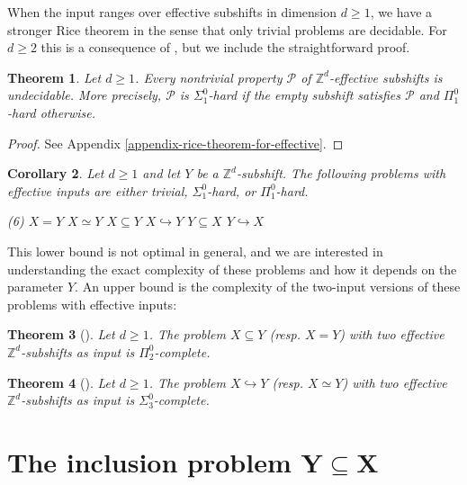 \documentclass[a4paper]{article}
\newcommand{\Z}{\mathbb{Z}}
\newtheorem{theorem}{Theorem}[section]
\newtheorem{corollary}[theorem]{Corollary}
\theoremstyle{definition}
\begin{document}
When the input ranges over effective subshifts in dimension $d\geq 1$, we have a stronger Rice theorem in the sense that only trivial problems are decidable. For $d\geq 2$ this is a consequence of  \cite[Theorem 5.1]{carrasco-vargas_rice_2025}, but we include the straightforward proof.
\begin{theorem}\label{rice-theorem-for-effective}
    Let $d\geq 1$. Every nontrivial property $\mathcal P$ of $\Z^d$-effective subshifts is undecidable. More precisely, $\mathcal P$ is $\Sigma_1^0$-hard if the empty subshift satisfies $\mathcal P$ and $\Pi_1^0$-hard otherwise.
\end{theorem}
\begin{proof}
    See Appendix \ref{appendix-rice-theorem-for-effective}.
\end{proof}

\begin{corollary}
    Let $d\geq 1$ and let $Y$ be a $\Z^d$-subshift. The following problems with effective inputs are either trivial, $\Sigma_1^0$-hard, or $\Pi_1^0$-hard.
\begin{tasks}[style=itemize](6)
    \task $X=Y$
    \task $X\simeq Y$ 
    \task $X\subseteq Y$
    \task $X\hookrightarrow Y$
    \task $Y\subseteq X$
    \task $Y\hookrightarrow X$
\end{tasks}
\end{corollary}
This lower bound is not optimal in general, and we are interested in understanding the exact complexity of these problems and how it depends on the parameter $Y$. An upper bound is the complexity of the two-input versions of these problems with effective inputs:
\begin{theorem}[\cite{jeandel_hardness_2015}]\label{upper-bound-inclusion-two-sofic-subshifts}
Let $d\geq 1$. The problem $X\subseteq Y$ (resp. $X=Y$) with two effective $\Z^d$-subshifts as input is $\Pi_2^0$-complete. 
\end{theorem}
\begin{theorem}[\cite{jeandel_hardness_2015}]\label{embedding-two-effective}\label{conjugacy-two-effective-subshifts}
Let $d\geq 1$. The problem $X\hookrightarrow Y$ (resp. $X\simeq Y$) with two effective $\Z^d$-subshifts as input is $\Sigma_3^0$-complete. 
\end{theorem}

\section{The inclusion problem $\mathbf{Y\subseteq X}$}\label{sec:Y-contained-in-X}
\end{document}

